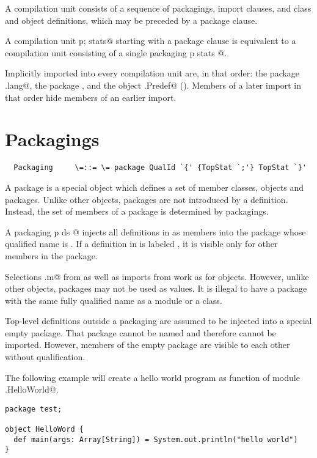 \documentclass[11pt]{report}
\begin{document}
A compilation unit consists of a sequence of packagings, import
clauses, and class and object definitions, which may be preceded by a
package clause.

A compilation unit \verb@package p; stats@ starting with a package
clause is equivalent to a compilation unit consisting of a single
packaging \verb@package p { stats }@.

Implicitly imported into every compilation unit are, in that order:
the package \verb@java.lang@, the package \verb@scala@, and the object
\verb@scala.Predef@ (). Members of a later import in
that order hide members of an earlier import.

\section{Packagings}

\syntax\begin{verbatim}
  Packaging     \=::= \= package QualId `{' {TopStat `;'} TopStat `}'
\end{verbatim}

A package is a special object which defines a set of member classes,
objects and packages.  Unlike other objects, packages are not introduced
by a definition.  Instead, the set of members of a package is determined by
packagings.

A packaging \verb@package p { ds }@ injects all definitions in
\verb@ds@ as members into the package whose qualified name is
\verb@p@. If a definition in \verb@ds@ is labeled \verb@private@, it
is visible only for other members in the package.

Selections \verb@p.m@ from \verb@p@ as well as imports from \verb@p@
work as for objects. However, unlike other objects, packages may not
be used as values. It is illegal to have a package with the same fully
qualified name as a module or a class.

Top-level definitions outside a packaging are assumed to be injected
into a special empty package. That package cannot be named and
therefore cannot be imported. However, members of the empty package
are visible to each other without qualification.

\example The following example will create a hello world program as
function \verb@main@ of module \verb@test.HelloWorld@.
\begin{verbatim}
package test;

object HelloWord {
  def main(args: Array[String]) = System.out.println("hello world")
}
\end{verbatim}
\end{document}
